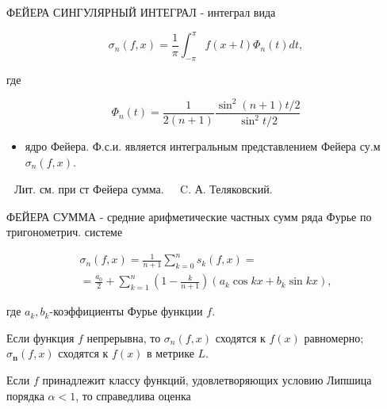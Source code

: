 \documentclass[10pt]{article}
\begin{document}
ФЕЙЕРА СИНГУЛЯРНЫЙ ИНТЕГРАЛ - интеграл вида



\[

\sigma_{n}(f, x)=\frac{1}{\pi} \int_{-\pi}^{\pi} f(x+l) \Phi_{n}(t) d t,

\]



где



\[

\Phi_{n}(t)=\frac{1}{2(n+1)} \frac{\sin ^{2}(n+1) t / 2}{\sin ^{2} t / 2}

\]



\begin{itemize}

  \item ядро Фейера. Ф.с.и. является интегральным представлением Фейера су.м $\sigma_{n}(f, x)$.

\end{itemize}



$\begin{array}{ll}\text { Лит. см. при ст Фейера сумма. } & \text { C. А. Теляковский. }\end{array}$



ФЕЙЕРА СУММА - средние арифметические частных сумм ряда Фурье по тригонометрич. системе



\[

\begin{gathered}

\sigma_{n}(f, x)=\frac{1}{n+1} \sum_{k=0}^{n} s_{k}(f, x)= \\

=\frac{a_{0}}{2}+\sum_{k=1}^{n}\left(1-\frac{k}{n+1}\right)\left(a_{k} \cos k x+b_{k} \sin k x\right),

\end{gathered}

\]



где $a_{k}, b_{k}$-коэффициенты Фурье функции $f$.



Если функция $f$ непрерывна, то $\sigma_{n}(f, x)$ сходятся к $f(x)$ равномерно; $\sigma_{\boldsymbol{n}}(f, x)$ сходятся к $f(x)$ в метрике $L$.



Если $f$ принадлежит классу функций, удовлетворяющих условию Липшица порядка $\alpha<1$, то справедлива оценка
\end{document}
